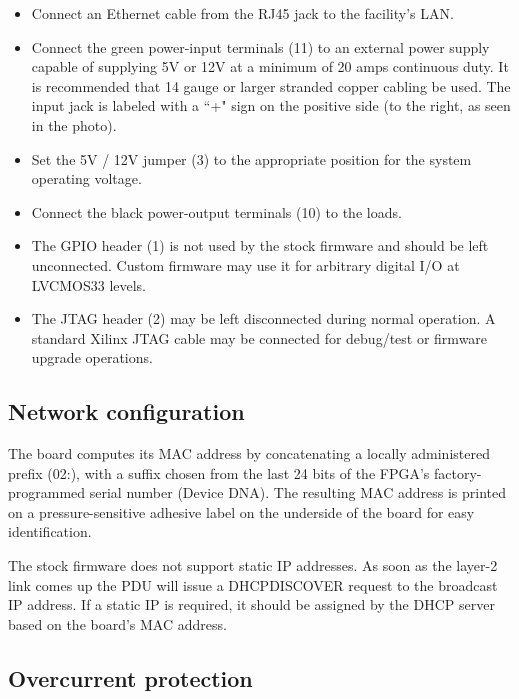 \documentclass{article}
\begin{document}
\begin{itemize}

\item Connect an Ethernet cable from the RJ45 jack to the facility's LAN. 

\item Connect the green power-input terminals (11) to an external power supply capable of supplying 5V or 12V at a
minimum of 20 amps continuous duty. It is recommended that 14 gauge or larger stranded copper cabling be used. The input 
jack is labeled with a ``+" sign on the positive side (to the right, as seen in the photo).

\item Set the 5V / 12V jumper (3) to the appropriate position for the system operating voltage.

\item Connect the black power-output terminals (10) to the loads.

\item The GPIO header (1) is not used by the stock firmware and should be left unconnected. Custom firmware may use 
it for arbitrary digital I/O at LVCMOS33 levels.

\item The JTAG header (2) may be left disconnected during normal operation. A standard Xilinx JTAG cable may be connected 
for debug/test or firmware upgrade operations.

\end{itemize}

\subsection{Network configuration}

The board computes its MAC address by concatenating a locally administered prefix (02:), with a suffix chosen from the
last 24 bits of the FPGA's factory-programmed serial number (Device DNA). The resulting MAC address is printed on a
pressure-sensitive adhesive label on the underside of the board for easy identification.

The stock firmware does not support static IP addresses. As soon as the layer-2 link comes up the PDU will issue a 
DHCPDISCOVER request to the broadcast IP address. If a static IP is required, it should be assigned by the DHCP 
server based on the board's MAC address.

\subsection{Overcurrent protection}
\end{document}
